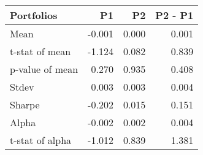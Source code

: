 \begin{tabular}{lrrr}
\toprule
Portfolios & P1 & P2 & P2 - P1 \\
\midrule
Mean & -0.001 & 0.000 & 0.001 \\
t-stat of mean & -1.124 & 0.082 & 0.839 \\
p-value of mean & 0.270 & 0.935 & 0.408 \\
Stdev & 0.003 & 0.003 & 0.004 \\
Sharpe & -0.202 & 0.015 & 0.151 \\
Alpha & -0.002 & 0.002 & 0.004 \\
t-stat of alpha & -1.012 & 0.839 & 1.381 \\
\bottomrule
\end{tabular}
